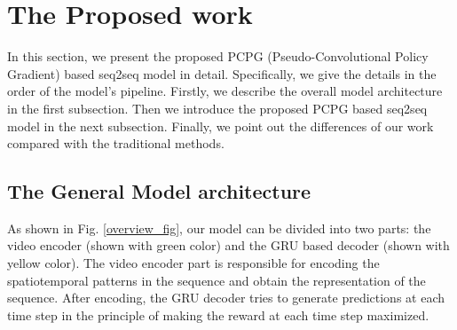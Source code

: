 \documentclass[a4paper, 10pt, conference]{ieeeconf}      %
\begin{document}
\section{The Proposed work}
\label{sec:Pro}
In this section, we present the proposed PCPG (Pseudo-Convolutional Policy Gradient) based seq2seq model in detail. Specifically, we give the details in the order of the model's pipeline. Firstly, we describe the overall model architecture in the first subsection. Then we introduce the proposed PCPG based seq2seq model in the next subsection. Finally, we point out the differences of our work compared with the traditional methods.

\subsection{The General Model architecture} \label{section3.1}
As shown in Fig. \ref{overview_fig}, our model can be divided into two parts: the video encoder (shown with green color) and the GRU based decoder (shown with yellow color). The video encoder part is responsible for encoding the spatiotemporal patterns in the sequence and obtain the representation of the sequence. After encoding, the GRU decoder tries to generate predictions at each time step in the principle of making the reward at each time step maximized.
\end{document}
